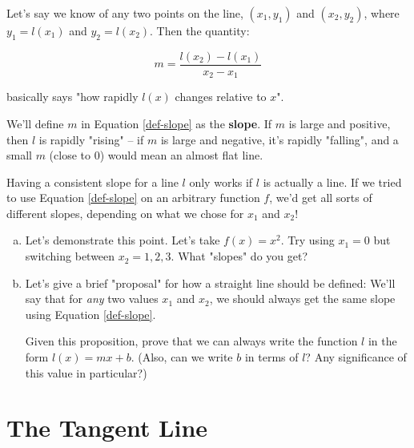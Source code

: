 Let's say we know of any two points on the line, $(x_1, y_1)$ and $(x_2, y_2)$, where $y_1 = l(x_1)$ and $y_2 = l(x_2)$. Then the quantity:

\begin{equation}
\label{def-slope}
m = \frac{l(x_2) - l(x_1)}{x_2 - x_1}
\end{equation}

basically says "how rapidly $l(x)$ changes relative to $x$". 

We'll define $m$ in Equation \ref{def-slope} as the \textbf{slope}. If $m$ is large and positive, then $l$ is rapidly "rising" -- if $m$ is large and negative, it's rapidly "falling", and a small $m$ (close to 0) would mean an almost flat line.

\begin{exercise}
\label{slope-qns}
Having a consistent slope for a line $l$ only works if $l$ is actually a line. If we tried to use Equation \ref{def-slope} on an arbitrary function $f$, we'd get all sorts of different slopes, depending on what we chose for $x_1$ and $x_2$!

\vspace{2in}

\begin{enumerate}[(a)]
\item Let's demonstrate this point. Let's take $f(x) = x^2$. Try using $x_1 = 0$ but switching between $x_2 = 1, 2, 3$. What "slopes" do you get?

\item Let's give a brief "proposal" for how a straight line should be defined: We'll say that for \textit{any} two values $x_1$ and $x_2$, we should always get the same slope using Equation \ref{def-slope}. 

Given this proposition, prove that we can always write the function $l$ in the form $l(x) = mx + b$. (Also, can we write $b$ in terms of $l$? Any significance of this value in particular?)
\end{enumerate}
\end{exercise}



\section{The Tangent Line}


